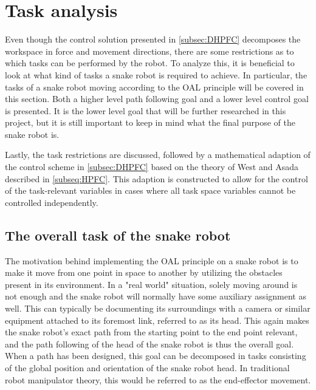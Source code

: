 



\section{Task analysis}

Even though the control solution presented in \ref{subsec:DHPFC} decomposes the workspace in force and movement directions, there are some restrictions as to which tasks can be performed by the robot. To analyze this, it is beneficial to look at what kind of tasks a snake robot is required to achieve. In particular, the tasks of a snake robot moving according to the OAL principle will be covered in this section. Both a higher level path following goal and a lower level control goal is presented. It is the lower level goal that will be further researched in this project, but it is still important to keep in mind what the final purpose of the snake robot is.

Lastly, the task restrictions are discussed, followed by a mathematical adaption of the control scheme in \ref{subsec:DHPFC} based on the theory of West and Asada \cite{west1985method} described in \ref{subseq:HPFC}. This adaption is constructed to allow for the control of the task-relevant variables in cases where all task space variables cannot be controlled independently.

\subsection{The overall task of the snake robot}

The motivation behind implementing the OAL principle on a snake robot is to make it move from one point in space to another by utilizing the obstacles present in its environment. In a "real world" situation, solely moving around is not enough and the snake robot will normally have some auxiliary assignment as well. This can typically be documenting its surroundings with a camera or similar equipment attached to its foremost link, referred to as its head. This again makes the snake robot's exact path from the starting point to the end point relevant, and the path following of the head of the snake robot is thus the overall goal. When a path has been designed, this goal can be decomposed in tasks consisting of the global position and orientation of the snake robot head. In traditional robot manipulator theory, this would be referred to as the end-effector movement. 


